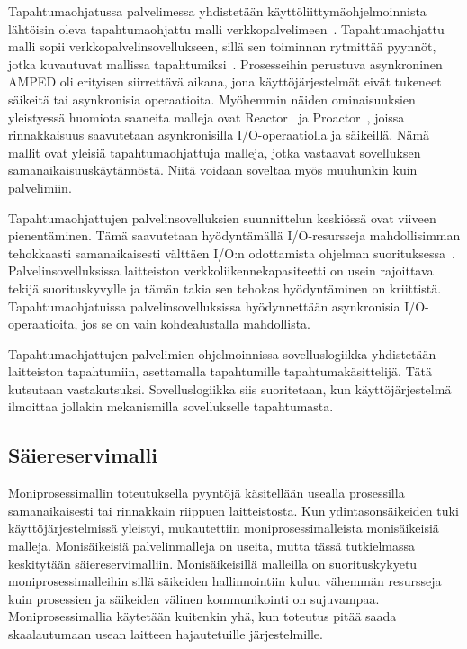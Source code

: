 \documentclass[finnish]{tktltiki2}%
\theoremstyle{definition}
\theoremstyle{remark}
\begin{document}
Tapahtumaohjatussa palvelimessa yhdistetään
käyttöliittymäohjelmoinnista lähtöisin oleva tapahtumaohjattu malli
verkkopalvelimeen~\cite{pai_flash_1999}. Tapahtumaohjattu malli sopii verkkopalvelinsovellukseen,
sillä sen toiminnan rytmittää pyynnöt, jotka
kuvautuvat mallissa tapahtumiksi~\cite{schmidt_reactor:_1995}.
Prosesseihin perustuva asynkroninen AMPED\cite{pai_flash_1999}
oli erityisen siirrettävä aikana, jona käyttöjärjestelmät
eivät tukeneet säikeitä tai asynkronisia operaatioita.
Myöhemmin näiden ominaisuuksien yleistyessä
huomiota saaneita malleja ovat Reactor~\cite{schmidt_reactor:_1995}
ja Proactor~\cite{hu_applying_1998}, joissa
rinnakkaisuus saavutetaan asynkronisilla I/O-operaatiolla
ja säikeillä. Nämä mallit ovat yleisiä tapahtumaohjattuja malleja, jotka
vastaavat sovelluksen samanaikaisuuskäytännöstä.
Niitä voidaan soveltaa myös muuhunkin kuin palvelimiin.


Tapahtumaohjattujen palvelinsovelluksien suunnittelun keskiössä
ovat viiveen pienentäminen.
Tämä saavutetaan hyödyntämällä I/O-resursseja mahdollisimman tehokkaasti
samanaikaisesti välttäen I/O:n odottamista ohjelman suorituksessa~\cite{pai_flash_1999}.
Palvelinsovelluksissa
laitteiston verkkoliikennekapasiteetti on usein rajoittava tekijä suorituskyvylle ja tämän takia
sen tehokas hyödyntäminen on kriittistä. Tapahtumaohjatuissa palvelinsovelluksissa
hyödynnettään asynkronisia I/O-operaatioita, jos se on vain 
kohdealustalla mahdollista.

Tapahtumaohjattujen palvelimien ohjelmoinnissa sovelluslogiikka yhdistetään
laitteiston tapahtumiin, asettamalla tapahtumille tapahtumakäsittelijä.
Tätä kutsutaan vastakutsuksi. Sovelluslogiikka siis suoritetaan, kun
käyttöjärjestelmä ilmoittaa jollakin mekanismilla sovellukselle tapahtumasta.


\subsection{Säiereservimalli}
Moniprosessimallin toteutuksella pyyntöjä käsitellään
usealla prosessilla samanaikaisesti tai rinnakkain riippuen laitteistosta.
Kun ydintasonsäikeiden tuki käyttöjärjestelmissä yleistyi, mukautettiin
moniprosessimalleista monisäikeisiä malleja.
Monisäikeisiä palvelinmalleja on useita, mutta tässä tutkielmassa keskitytään säiereservimalliin.
Monisäikeisillä malleilla on suorituskykyetu moniprosessimalleihin sillä säikeiden
hallinnointiin
kuluu vähemmän resursseja kuin prosessien ja säikeiden välinen kommunikointi on sujuvampaa.
Moniprosessimallia käytetään kuitenkin yhä, kun toteutus pitää
saada skaalautumaan usean laitteen hajautetuille järjestelmille.
\end{document}
